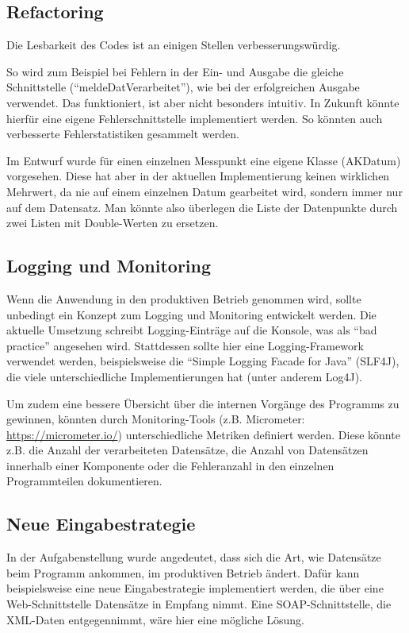 \subsection{Refactoring}\label{subsec:refactoring}
Die Lesbarkeit des Codes ist an einigen Stellen verbesserungswürdig.

So wird zum Beispiel bei Fehlern in der Ein- und Ausgabe die gleiche Schnittstelle (\enquote{meldeDatVerarbeitet}), wie bei der erfolgreichen Ausgabe verwendet.
Das funktioniert, ist aber nicht besonders intuitiv.
In Zukunft könnte hierfür eine eigene Fehlerschnittstelle implementiert werden.
So könnten auch verbesserte Fehlerstatistiken gesammelt werden.

Im Entwurf wurde für einen einzelnen Messpunkt eine eigene Klasse (AKDatum) vorgesehen.
Diese hat aber in der aktuellen Implementierung keinen wirklichen Mehrwert, da nie auf einem einzelnen Datum gearbeitet wird, sondern immer nur auf dem Datensatz.
Man könnte also überlegen die Liste der Datenpunkte durch zwei Listen mit Double-Werten zu ersetzen.

\subsection{Logging und Monitoring}\label{subsec:log-moni}
Wenn die Anwendung in den produktiven Betrieb genommen wird, sollte unbedingt ein Konzept zum Logging und Monitoring entwickelt werden.
Die aktuelle Umsetzung schreibt Logging-Einträge auf die Konsole, was als \enquote{bad practice} angesehen wird.
Stattdessen sollte hier eine Logging-Framework verwendet werden, beispielsweise die \enquote{Simple Logging Facade for Java} (SLF4J), die viele unterschiedliche Implementierungen hat (unter anderem Log4J).

Um zudem eine bessere Übersicht über die internen Vorgänge des Programms zu gewinnen, könnten durch Monitoring-Tools (z.B. Micrometer: \url{https://micrometer.io/}) unterschiedliche Metriken definiert werden.
Diese könnte z.B. die Anzahl der verarbeiteten Datensätze, die Anzahl von Datensätzen innerhalb einer Komponente oder die Fehleranzahl in den einzelnen Programmteilen dokumentieren.

\subsection{Neue Eingabestrategie}\label{subsec:eingabestrat}
In der Aufgabenstellung wurde angedeutet, dass sich die Art, wie Datensätze beim Programm ankommen, im produktiven Betrieb ändert.
Dafür kann beispielsweise eine neue Eingabestrategie implementiert werden, die über eine Web-Schnittstelle Datensätze in Empfang nimmt.
Eine SOAP-Schnittstelle, die XML-Daten entgegennimmt, wäre hier eine mögliche Lösung.
